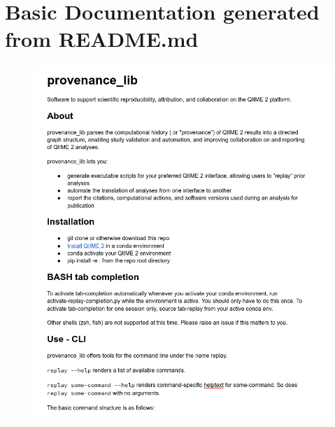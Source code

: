 \chapter{Basic Documentation generated from README.md}
\label{fig:basicDocs}

\begin{figure}[htp]
\centering
\includegraphics[width=.95\textwidth]{figures/AppA1.png}
\end{figure}

